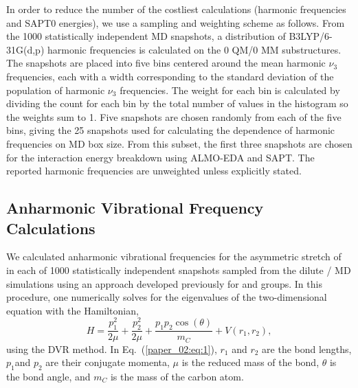 \documentclass[%
  class = book,%
  crop = false,%
  float = true,%
  multi = true,%
  preview = false,%
]{standalone}
\begin{document}
In order to reduce the number of the costliest calculations (harmonic frequencies and SAPT0 energies), we use a sampling and weighting scheme as follows. From the \num{1000} statistically independent MD snapshots, a distribution of B3LYP/6-31G(d,p) harmonic frequencies is calculated on the 0 QM/0 MM substructures. The snapshots are placed into five bins centered around the mean harmonic \(\nu_{3}\) frequencies, each with a width corresponding to the standard deviation of the population of harmonic \(\nu_{3}\) frequencies. The weight for each bin is calculated by dividing the count for each bin by the total number of values in the histogram so the weights sum to \num{1}. Five snapshots are chosen randomly from each of the five bins, giving the \num{25} snapshots used for calculating the dependence of harmonic frequencies on MD box size. From this subset, the first three snapshots are chosen for the interaction energy breakdown using ALMO-EDA and SAPT. The reported harmonic frequencies are unweighted unless explicitly stated.

\subsection{Anharmonic Vibrational Frequency Calculations}
\label{paper_02:ssec:IIB}

We calculated anharmonic vibrational frequencies for the asymmetric stretch of  in each of \num{1000} statistically independent snapshots sampled from the dilute /\ce{[C4C1im][PF6]} MD simulations using an approach developed previously for  and  groups.\cite{levinson_phosphate_2011,Kinnaman2006} In this procedure, one numerically solves for the eigenvalues of the two-dimensional \schrod{} equation with the Hamiltonian,
\begin{equation}
  \label{paper_02:eq:1}
H = \frac{p_{1}^{2}}{2\mu} + \frac{p_{2}^{2}}{2\mu} + \frac{p_{1}p_{2}\cos{(\theta)}}{m_{C}} + V\left( r_{1},r_{2} \right),
\end{equation}
using the DVR method.\cite{colbert_novel_1992,seideman_quantum_1992} In Eq.~(\ref{paper_02:eq:1}), \(r_{1}\) and \(r_{2}\) are the  bond lengths, \(p_{1}\)and \(p_{2}\) are their conjugate momenta, \(\mu\) is the reduced mass of the  bond, \(\theta\) is the  bond angle, and \(m_C\) is the mass of the carbon atom.
\end{document}
